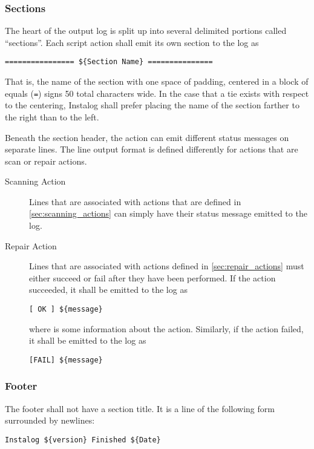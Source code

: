 \subsubsection{Sections} \label{logoutput}
The heart of the output log is split up into several delimited portions called
``sections''.  Each script action shall emit its own section to the log as

\begin{verbatim}
================ ${Section Name} ===============
\end{verbatim}

That is, the name of the section with one space of padding, centered in a block
of equals (\verb|=|) signs 50 total characters wide. In the case that a tie
exists with respect to the centering, Instalog shall prefer placing the name of
the section farther to the right than to the left.

Beneath the section header, the action can emit different status messages on
separate lines.  The line output format is defined differently for actions that
are scan or repair actions.
\begin{description}
\item[Scanning Action]
Lines that are associated with actions that are defined in
\ref{sec:scanning_actions} can simply have their status message emitted to the log.
\item[Repair Action] \label{repairoutput}
Lines that are associated with actions defined in \ref{sec:repair_actions} must
either succeed or fail after they have been performed.  If the action succeeded,
it shall be emitted to the log as
\vspace{-\baselineskip}
\begin{verbatim}
[ OK ] ${message}
\end{verbatim}
where  is some information about the action.  Similarly, if the
action failed, it shall be emitted to the log as
\vspace{-\baselineskip}
\begin{verbatim}
[FAIL] ${message}
\end{verbatim}
\end{description}

\subsubsection{Footer}
The footer shall not have a section title. It is a line of the following form
surrounded by newlines:
\begin{verbatim}
Instalog ${version} Finished ${Date}
\end{verbatim}

